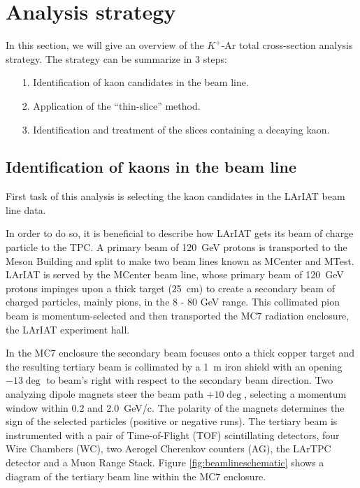 \section{Analysis strategy}\label{sec:kaonAnalysis} 
 
In this section, we will give an overview of the $K^{+}$-Ar total cross-section analysis strategy. 
The strategy can be summarize in 3 steps:
\begin{itemize}
\item[1.] Identification of kaon candidates in the beam line.
\item[2.] Application of the ``thin-slice'' method.
\item[3.] Identification and treatment of the slices containing a decaying kaon.
\end{itemize}

\subsection{Identification of kaons in the beam line}
First task of this analysis is selecting the kaon candidates in the LArIAT beam line data.

In order to do so,  it is beneficial to describe how LArIAT gets its beam of charge particle to the TPC. A primary beam of 120~GeV protons is transported to the Meson Building and split to make two beam lines known as MCenter and MTest. LArIAT is served by the MCenter beam line, whose primary beam of 120~GeV protons impinges upon a thick target (25~cm) to create a secondary beam of charged particles, mainly pions, in the 8 - 80 GeV range. This collimated pion beam is momentum-selected and then transported the MC7 radiation enclosure, the LArIAT experiment hall.  

In the MC7 enclosure the secondary beam focuses onto a thick copper target and the resulting tertiary beam is collimated by a 1~m iron shield with an opening $-13\deg$ to beam's right with respect to the secondary beam direction. Two analyzing dipole magnets steer the beam path $+10\deg$, selecting a momentum window within 0.2 and 2.0~GeV/c. The polarity of the magnets determines the sign of the selected particles (positive or negative runs). The tertiary beam is instrumented with a pair of Time-of-Flight (TOF) scintillating detectors,  four Wire Chambers (WC), two Aerogel Cherenkov counters (AG), the LArTPC detector and a Muon Range Stack. Figure \ref{fig:beamlineschematic} shows a diagram of the tertiary beam line within the MC7 enclosure.

